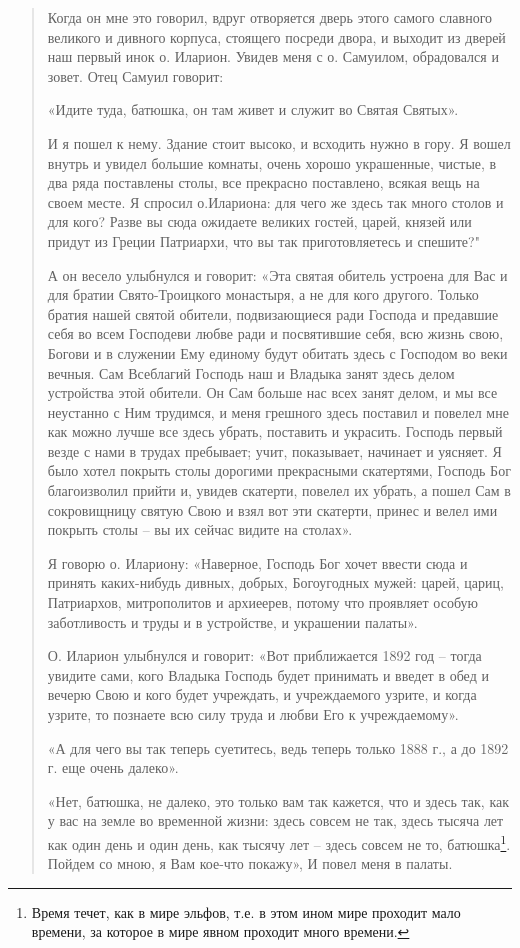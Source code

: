 \begin{quotation}
Когда он мне это говорил, вдруг отворяется дверь этого самого славного великого и дивного корпуса, стоящего посреди двора, и выходит из дверей наш первый инок о. Иларион. Увидев меня с о. Самуилом, обрадовался и зовет. Отец Самуил говорит: 

«Идите туда, батюшка, он там живет и служит во Святая Святых». 

И я пошел к нему. Здание стоит высоко, и всходить нужно в гору. Я вошел внутрь и увидел большие комнаты, очень хорошо украшенные, чистые, в два ряда поставлены столы, все прекрасно поставлено, всякая вещь на своем месте. Я спросил о.Илариона: для чего же здесь так много столов и для кого? Разве вы сюда ожидаете великих  гостей, царей, князей или придут из Греции Патриархи, что вы так приготовляетесь и спешите?" 

А он весело улыбнулся и говорит: «Эта святая обитель устроена для Вас и для братии Свято-Троицкого монастыря, а не для кого другого. Только братия нашей святой обители, подвизающиеся ради Господа и предавшие себя во всем Господеви любве ради и посвятившие себя, всю жизнь свою, Богови и в служении Ему единому будут обитать здесь с Господом во веки вечныя. Сам Всеблагий Господь наш и Владыка занят здесь делом устройства этой обители. Он Сам больше нас всех занят делом, и мы все неустанно с Ним трудимся, и меня грешного здесь поставил и повелел мне как можно лучше все здесь убрать, поставить и украсить. Господь первый везде с нами в трудах пребывает; учит, показывает, начинает и уясняет. Я было хотел покрыть столы дорогими прекрасными скатертями, Господь Бог благоизволил прийти и, увидев скатерти, повелел их убрать, а пошел Сам в сокровищницу святую Свою и взял вот эти скатерти, принес и велел ими покрыть столы – вы их сейчас видите на столах».

Я говорю о. Илариону: «Наверное, Господь Бог хочет ввести сюда и принять каких-нибудь дивных, добрых, Богоугодных мужей: царей, цариц, Патриархов, митрополитов и архиеерев, потому что проявляет особую заботливость и труды и в устройстве, и украшении палаты».

 О. Иларион улыбнулся и говорит: «Вот приближается 1892 год – тогда увидите сами, кого Владыка Господь будет принимать и введет в обед и вечерю Свою и кого будет учреждать, и учреждаемого узрите, и когда узрите, то познаете всю силу труда и любви Его к учреждаемому». 

«А для чего вы так теперь суетитесь, ведь теперь только 1888 г., а до 1892 г. еще очень далеко». 

«Нет, батюшка, не далеко, это только вам так кажется, что и здесь так, как у вас на земле во временной жизни: здесь совсем не так, здесь тысяча лет как один день и один день, как тысячу лет – здесь совсем не то, батюшка\footnote{Время течет, как в мире эльфов, т.е. в этом ином мире проходит мало времени, за которое в мире явном проходит много времени.}. Пойдем со мною, я Вам кое-что покажу», И повел меня в палаты.


\end{quotation}
